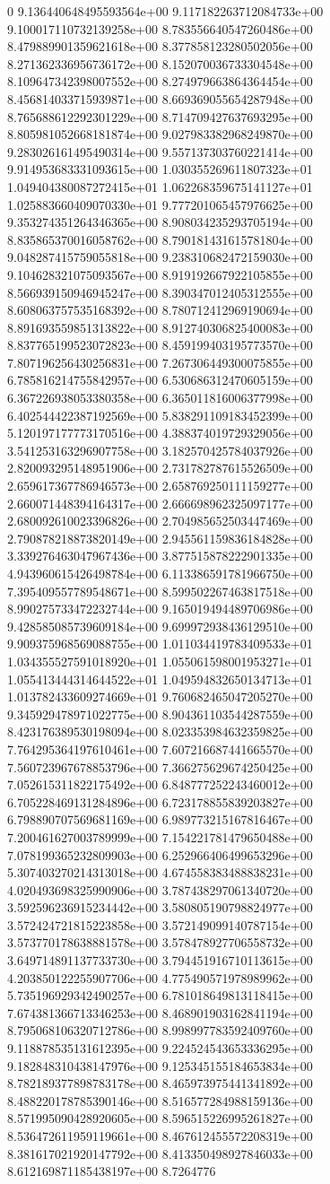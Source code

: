 0	9.136440648495593564e+00	9.117182263712084733e+00	9.100017110732139258e+00	8.783556640547260486e+00	8.479889901359621618e+00	8.377858123280502056e+00	8.271362336956736172e+00	8.152070036733304548e+00	8.109647342398007552e+00	8.274979663864364454e+00	8.456814033715939871e+00	8.669369055654287948e+00	8.765688612292301229e+00	8.714709427637693295e+00	8.805981052668181874e+00	9.027983382968249870e+00	9.283026161495490314e+00	9.557137303760221414e+00	9.914953683331093615e+00	1.030355269611807323e+01	1.049404380087272415e+01	1.062268359675141127e+01	1.025883660409070330e+01	9.777201065457976625e+00	9.353274351264346365e+00	8.908034235293705194e+00	8.835865370016058762e+00	8.790181431615781804e+00	9.048287415759055818e+00	9.238310682472159030e+00	9.104628321075093567e+00	8.919192667922105855e+00	8.566939150946945247e+00	8.390347012405312555e+00	8.608063757535168392e+00	8.780712412969190694e+00	8.891693559851313822e+00	8.912740306825400083e+00	8.837765199523072823e+00	8.459199403195773570e+00	7.807196256430256831e+00	7.267306449300075855e+00	6.785816214755842957e+00	6.530686312470605159e+00	6.367226938053380358e+00	6.365011816006377998e+00	6.402544422387192569e+00	5.838291109183452399e+00	5.120197177773170516e+00	4.388374019729329056e+00	3.541253163296907758e+00	3.182570425784037926e+00	2.820093295148951906e+00	2.731782787615526509e+00	2.659617367786946573e+00	2.658769250111159277e+00	2.660071448394164317e+00	2.666698962325097177e+00	2.680092610023396826e+00	2.704985652503447469e+00	2.790878218873820149e+00	2.945561159836184828e+00	3.339276463047967436e+00	3.877515878222901335e+00	4.943960615426498784e+00	6.113386591781966750e+00	7.395409557789548671e+00	8.599502267463817518e+00	8.990275733472232744e+00	9.165019494489706986e+00	9.428585085739609184e+00	9.699972938436129510e+00	9.909375968569088755e+00	1.011034419783409533e+01	1.034355527591018920e+01	1.055061598001953271e+01	1.055413444314644522e+01	1.049594832650134713e+01	1.013782433609274669e+01	9.760682465047205270e+00	9.345929478971022775e+00	8.904361103544287559e+00	8.423176389530198094e+00	8.023353984632359825e+00	7.764295364197610461e+00	7.607216687441665570e+00	7.560723967678853796e+00	7.366275629674250425e+00	7.052615311822175492e+00	6.848777252243460012e+00	6.705228469131284896e+00	6.723178855839203827e+00	6.798890707569681169e+00	6.989773215167816467e+00	7.200461627003789999e+00	7.154221781479650488e+00	7.078199365232809903e+00	6.252966406499653296e+00	5.307403270214313018e+00	4.674558383488838231e+00	4.020493698325990906e+00	3.787438297061340720e+00	3.592596236915234442e+00	3.580805190798824977e+00	3.572424721815223858e+00	3.572149099140787154e+00	3.573770178638881578e+00	3.578478927706558732e+00	3.649714891137733730e+00	3.794451916710113615e+00	4.203850122255907706e+00	4.775490571978989962e+00	5.735196929342490257e+00	6.781018649813118415e+00	7.674381366713346253e+00	8.468901903162841194e+00	8.795068106320712786e+00	8.998997783592409760e+00	9.118878535131612395e+00	9.224524543653336295e+00	9.182848310438147976e+00	9.125345155184653834e+00	8.782189377898783178e+00	8.465973975441341892e+00	8.488220178785390146e+00	8.516577284988159136e+00	8.571995090428920605e+00	8.596515226995261827e+00	8.536472611959119661e+00	8.467612455572208319e+00	8.381617021920147792e+00	8.413350498927846033e+00	8.612169871185438197e+00	8.7264776